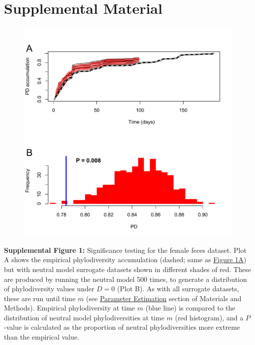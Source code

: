 \documentclass{article}
\begin{document}
\section{Supplemental Material}
{\parindent0pt %
\begin{figure}[ht]
	\centering
	\includegraphics[scale=0.80]{figs/Fig_S1.pdf}
\end{figure}
\textbf{Supplemental Figure 1:}\label{sec:figureS1} Significance testing for the female feces dataset. Plot A shows the empirical phylodiversity accumulation (dashed; same as \hyperref[sec:figure1]{Figure 1A}) but with neutral model surrogate datasets shown in different shades of red. These are produced by running the neutral model 500 times, to generate a distribution of phylodiversity values under \(D = 0\) (Plot B). As with all surrogate datasets, these are run until time \(m\) (see \hyperref[sec:parameterEstimation]{Parameter Estimation} section of Materials and Methods). Empirical phylodiversity at time \(m\) (blue line) is compared to the distribution of neutral model phylodiversities at time \(m\) (red histogram), and a \(P\)-value is calculated as the proportion of neutral phylodiversities more extreme than the empirical value. 
\newpage

}
\end{document}

